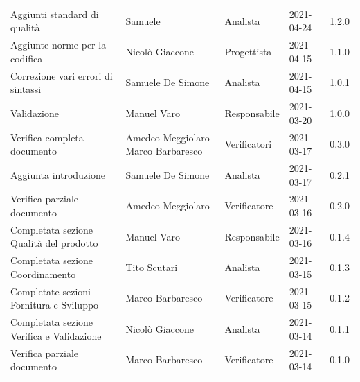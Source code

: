 \documentclass[a4paper]{article}
\begin{document}
\begin{center}
\begin{table}[h!]
\begin{tabular}{p{160px} p{86px} p{70px} p{60px} p{45px}}
            Aggiunti standard di qualità                                               & Samuele                                     & Analista       & 2021-04-24    & 1.2.0             \\
            Aggiunte norme per la codifica                                             & Nicolò Giaccone                             & Progettista    & 2021-04-15    & 1.1.0             \\
            Correzione vari errori di sintassi                                         & Samuele De Simone                           & Analista       & 2021-04-15    & 1.0.1             \\
            Validazione                                                                & Manuel Varo                                 & Responsabile   & 2021-03-20    & 1.0.0             \\
            Verifica completa documento                                                & Amedeo Meggiolaro \newline Marco Barbaresco & Verificatori   & 2021-03-17    & 0.3.0             \\
            Aggiunta introduzione                                                      & Samuele De Simone                           & Analista       & 2021-03-17    & 0.2.1             \\
            Verifica parziale documento                                                & Amedeo Meggiolaro                           & Verificatore   & 2021-03-16    & 0.2.0             \\
            Completata sezione Qualità del prodotto                                    & Manuel Varo                                 & Responsabile   & 2021-03-16    & 0.1.4             \\
            Completata sezione Coordinamento                                           & Tito Scutari                                & Analista       & 2021-03-15    & 0.1.3             \\
            Completate sezioni Fornitura e Sviluppo                                    & Marco Barbaresco                            & Verificatore   & 2021-03-15    & 0.1.2             \\
            Completata sezione Verifica e Validazione                                  & Nicolò Giaccone                             & Analista       & 2021-03-14    & 0.1.1             \\
            Verifica parziale documento                                                & Marco Barbaresco                            & Verificatore   & 2021-03-14    & 0.1.0             \\

\end{tabular}
\end{table}
\end{center}
\end{document}
